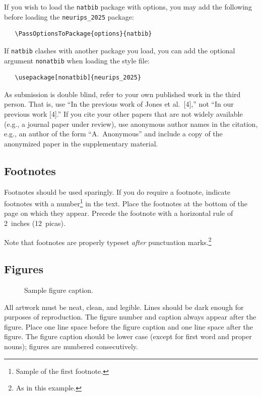 \documentclass{article}
\begin{document}
If you wish to load the \verb+natbib+ package with options, you may add the
following before loading the \verb+neurips_2025+ package:
\begin{verbatim}
   \PassOptionsToPackage{options}{natbib}
\end{verbatim}


If \verb+natbib+ clashes with another package you load, you can add the optional
argument \verb+nonatbib+ when loading the style file:
\begin{verbatim}
   \usepackage[nonatbib]{neurips_2025}
\end{verbatim}


As submission is double blind, refer to your own published work in the third
person. That is, use ``In the previous work of Jones et al.\ [4],'' not ``In our
previous work [4].'' If you cite your other papers that are not widely available
(e.g., a journal paper under review), use anonymous author names in the
citation, e.g., an author of the form ``A.\ Anonymous'' and include a copy of the anonymized paper in the supplementary material.


\subsection{Footnotes}


Footnotes should be used sparingly.  If you do require a footnote, indicate
footnotes with a number\footnote{Sample of the first footnote.} in the
text. Place the footnotes at the bottom of the page on which they appear.
Precede the footnote with a horizontal rule of 2~inches (12~picas).


Note that footnotes are properly typeset \emph{after} punctuation
marks.\footnote{As in this example.}


\subsection{Figures}


\begin{figure}
  \centering
  \fbox{\rule[-.5cm]{0cm}{4cm} \rule[-.5cm]{4cm}{0cm}}
  \caption{Sample figure caption.}
\end{figure}


All artwork must be neat, clean, and legible. Lines should be dark enough for
purposes of reproduction. The figure number and caption always appear after the
figure. Place one line space before the figure caption and one line space after
the figure. The figure caption should be lower case (except for first word and
proper nouns); figures are numbered consecutively.
\end{document}
